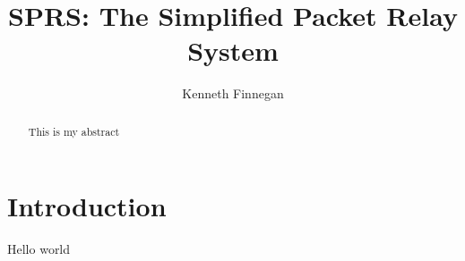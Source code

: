 \documentclass{report}
\begin{document}
\title{SPRS: The Simplified Packet Relay System}
\author{Kenneth Finnegan}
\maketitle

\begin{abstract}
This is my abstract
\end{abstract}

\section{Introduction}
Hello world
\end{document}
